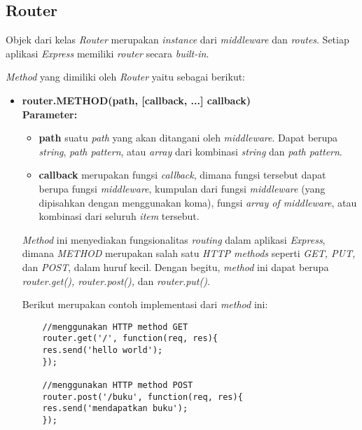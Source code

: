\subsection{Router}
Objek dari kelas \textit{Router} merupakan \textit{instance} dari \textit{middleware} dan \textit{routes}. Setiap aplikasi \textit{Express} memiliki \textit{router} secara \textit{built-in}. 

\textit{Method} yang dimiliki oleh \textit{Router} yaitu sebagai berikut:

\begin{itemize}
	\item \textbf{router.METHOD(path, [callback, ...] callback)} \\ \textbf{Parameter:} \\ 
	\begin{itemize}
		\item \textbf{path} suatu \textit{path} yang akan ditangani oleh \textit{middleware}. Dapat berupa \textit{string}, \textit{path pattern}, atau \textit{array} dari kombinasi \textit{string} dan \textit{path pattern}.
		
		\item \textbf{callback} merupakan fungsi \textit{callback}, dimana fungsi tersebut dapat berupa fungsi \textit{middleware}, kumpulan dari fungsi \textit{middleware} (yang dipisahkan dengan menggunakan koma), fungsi \textit{array of middleware}, atau kombinasi dari seluruh \textit{item} tersebut.
	\end{itemize}
	
	\textit{Method} ini menyediakan fungsionalitas \textit{routing} dalam aplikasi \textit{Express}, dimana \textit{METHOD} merupakan salah satu \textit{HTTP methods} seperti \textit{GET, PUT, } dan \textit{POST}, dalam huruf kecil. Dengan begitu, \textit{method} ini dapat berupa \textit{router.get(), router.post(),} dan \textit{router.put()}.
	
	Berikut merupakan contoh implementasi dari \textit{method} ini:
	\begin{lstlisting}
	//menggunakan HTTP method GET
	router.get('/', function(req, res){
	res.send('hello world');
	});
	
	//menggunakan HTTP method POST
	router.post('/buku', function(req, res){
	res.send('mendapatkan buku');
	});
	\end{lstlisting}
	
\end{itemize}




